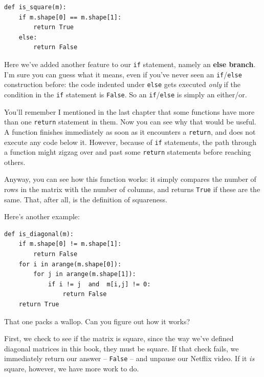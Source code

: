 
\label{multipleReturns}

\begin{Verbatim}[fontsize=\small,samepage=true,frame=single,framesep=3mm]
def is_square(m):
    if m.shape[0] == m.shape[1]:
        return True
    else:
        return False
\end{Verbatim}


Here we've added another feature to our \texttt{if} statement, namely an
\textbf{else branch}. I'm sure you can guess what it means, even if you've
never seen an \texttt{if}/\texttt{else} construction before: the code indented
under \texttt{else} gets executed \textit{only} if the condition in the
\texttt{if} statement is \texttt{False}. So an \texttt{if}/\texttt{else} is
simply an either/or.

You'll remember I mentioned in the last chapter that some functions have more
than one \texttt{return} statement in them. Now you can see why that would be
useful. A function finishes immediately as soon as it encounters a
\texttt{return}, and does not execute any code below it. However, because of
\texttt{if} statements, the path through a function might zigzag over and past
some \texttt{return} statements before reaching others.

Anyway, you can see how this function works: it simply compares the number of
rows in the matrix with the number of columns, and returns \texttt{True} if
these are the same. That, after all, is the definition of squareness.

\bigskip

Here's another example:

\begin{Verbatim}[fontsize=\small,samepage=true,frame=single,framesep=3mm]
def is_diagonal(m):
    if m.shape[0] != m.shape[1]:
        return False
    for i in arange(m.shape[0]):
        for j in arange(m.shape[1]):
            if i != j  and  m[i,j] != 0:
                return False
    return True
\end{Verbatim}

That one packs a wallop. Can you figure out how it works?

First, we check to see if the matrix is square, since the way we've defined
diagonal matrices in this book, they must be square. If that check fails, we
immediately return our answer -- \texttt{False} -- and unpause our Netflix
video. If it \textit{is} square, however, we have more work to do.

